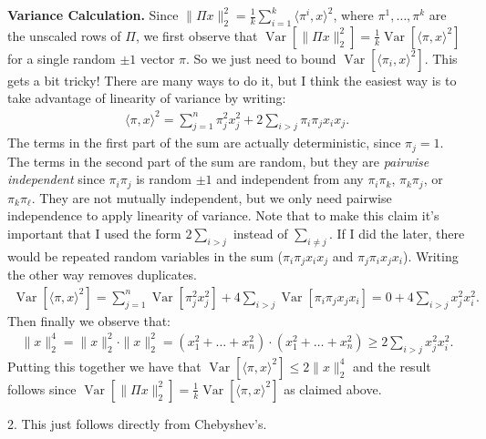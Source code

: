 \documentclass[11pt]{article}
\DeclareMathOperator{\var}{Var}
\begin{document}
 \textbf{Variance Calculation.} Since $\|\Pi x\|_2^2 = \frac{1}{k}\sum_{i=1}^k \langle \pi^i, x\rangle^2$, where $\pi^1, \ldots, \pi^k$ are the unscaled rows of $\Pi$, we first observe that $\var[\|\Pi x\|_2^2 ] = \frac{1}{k}\var[\langle \pi, x\rangle^2]$ for a single random $\pm 1$ vector $\pi$. So we just need to bound $\var[\langle \pi_i, x\rangle^2]$. This gets a bit tricky! There are many ways to do it, but I think the easiest way is to take advantage of linearity of variance by writing:
 \begin{align*}
 	\langle \pi, x\rangle^2 = \sum_{j=1}^n \pi_j^2 x_j^2 + 2\sum_{i> j} \pi_i\pi_j x_ix_j. 
 \end{align*}
The terms in the first part of the sum are actually deterministic, since $\pi_j = 1$. The terms in the second part of the sum are random, but they are \emph{pairwise independent} since $\pi_i\pi_j$ is random $\pm 1$ and independent from any $\pi_i\pi_k$, $\pi_k\pi_j$, or $\pi_k\pi_{\ell}$. They are not mutually independent, but we only need pairwise independence to apply linearity of variance. 
Note that to make this claim it's important that I used the form $2\sum_{i> j}$ instead of $\sum_{i\neq j}$. If I did the later, there would be repeated random variables in the sum ($\pi_i\pi_j x_ix_j$  and $\pi_j\pi_i x_jx_i$). Writing the other way removes duplicates.
\begin{align*}
	\var[\langle \pi, x\rangle^2] = \sum_{j=1}^n \var[\pi_j^2 x_j^2] + 4\sum_{i> j} \var[\pi_i\pi_j x_jx_i] = 0 + 4\sum_{i> j} x_j^2x_i^2.
\end{align*}
Then finally we observe that:
\begin{align*}
	\|x\|_2^4 = \|x\|_2^2\cdot \|x\|_2^2 = (x_1^2 + \ldots + x_n^2)\cdot (x_1^2 + \ldots + x_n^2) \geq 2\sum_{i> j} x_j^2x_i^2.
\end{align*} 
Putting this together we have that $\var[\langle \pi, x\rangle^2]  \leq 2 	\|x\|_2^4$ and the result follows since $\var[\|\Pi x\|_2^2 ] = \frac{1}{k}\var[\langle \pi, x\rangle^2]$ as claimed above.

\vspace{.5em}
2. This just follows directly from Chebyshev's.
\end{document}
